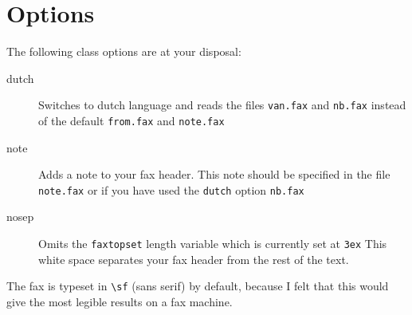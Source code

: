 \documentclass[oldtoc,a4paper,10pt]{artikel3}
\begin{document}
\section{Options}
The following class options are at your disposal:
\begin{description}
\item[dutch] Switches to dutch language and reads the files {\tt van.fax}
  and {\tt nb.fax} instead of the default {\tt from.fax} and {\tt note.fax}
\item[note] Adds a note to your fax header. This note should be specified
  in the file {\tt note.fax} or if you have used the {\tt dutch} option
  {\tt nb.fax}
\item[nosep] Omits the {\tt faxtopset} length variable which is currently
  set at {\tt 3ex} This white space separates your fax header from the rest
  of the text.
\end{description}

The fax is typeset in \verb|\sf| (sans serif) by default, because I felt
that this would give the most legible results on a fax machine.
\end{document}
